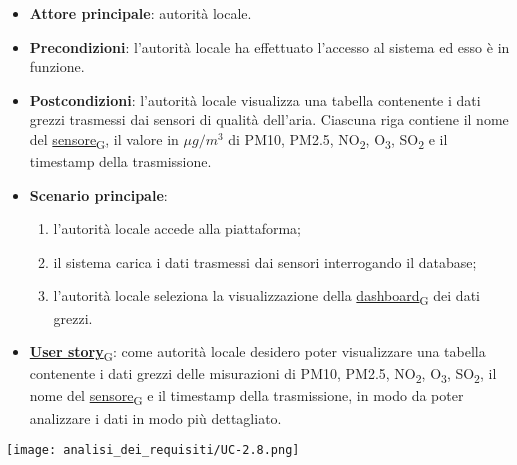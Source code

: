 \newpage
{}
\begin{itemize}
	\item \textbf{Attore principale}: autorità locale.
	\item \textbf{Precondizioni}: l'autorità locale ha effettuato l'accesso al sistema ed esso è in funzione.
	\item \textbf{Postcondizioni}: l'autorità locale visualizza una tabella contenente i dati grezzi trasmessi dai sensori di qualità dell'aria.
	      Ciascuna riga contiene il nome del \href{https://7last.github.io/docs/pb/documentazione-interna/glossario\#sensore}{sensore\textsubscript{G}}, il valore in $\mu g/m^3$ di PM10, PM2.5, NO\textsubscript{2}, O\textsubscript{3}, SO\textsubscript{2} e il timestamp della trasmissione.
	\item \textbf{Scenario principale}:
	      \begin{enumerate}
		      \item l'autorità locale accede alla piattaforma;
		      \item il sistema carica i dati trasmessi dai sensori interrogando il database;
		      \item l'autorità locale seleziona la visualizzazione della \href{https://7last.github.io/docs/pb/documentazione-interna/glossario\#dashboard}{dashboard\textsubscript{G}} dei dati grezzi.
	      \end{enumerate}
	\item \href{https://7last.github.io/docs/pb/documentazione-interna/glossario\#user-story}{\textbf{User story}\textsubscript{G}}:
	      come autorità locale desidero poter visualizzare una tabella contenente i dati grezzi delle misurazioni di PM10, PM2.5, NO\textsubscript{2}, O\textsubscript{3}, SO\textsubscript{2},
	      il nome del \href{https://7last.github.io/docs/pb/documentazione-interna/glossario\#sensore}{sensore\textsubscript{G}} e il timestamp della trasmissione, in modo da poter analizzare i dati in modo più dettagliato.
\end{itemize}
\begin{center}
	\texttt{[image: analisi\_dei\_requisiti/UC-2.8.png]}
\end{center}


